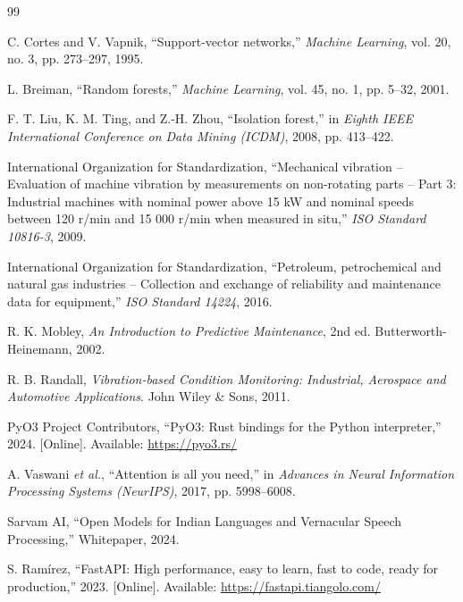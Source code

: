\documentclass[12pt,a4paper,oneside]{report}
\begin{document}
\newpage
\begin{thebibliography}{99}

C. Cortes and V. Vapnik, ``Support-vector networks,'' \textit{Machine Learning}, vol. 20, no. 3, pp. 273--297, 1995.

L. Breiman, ``Random forests,'' \textit{Machine Learning}, vol. 45, no. 1, pp. 5--32, 2001.

F. T. Liu, K. M. Ting, and Z.-H. Zhou, ``Isolation forest,'' in \textit{Eighth IEEE International Conference on Data Mining (ICDM)}, 2008, pp. 413--422.

International Organization for Standardization, ``Mechanical vibration -- Evaluation of machine vibration by measurements on non-rotating parts -- Part 3: Industrial machines with nominal power above 15 kW and nominal speeds between 120 r/min and 15 000 r/min when measured in situ,'' \textit{ISO Standard 10816-3}, 2009.

International Organization for Standardization, ``Petroleum, petrochemical and natural gas industries -- Collection and exchange of reliability and maintenance data for equipment,'' \textit{ISO Standard 14224}, 2016.

R. K. Mobley, \textit{An Introduction to Predictive Maintenance}, 2nd ed. Butterworth-Heinemann, 2002.

R. B. Randall, \textit{Vibration-based Condition Monitoring: Industrial, Aerospace and Automotive Applications}. John Wiley \& Sons, 2011.

PyO3 Project Contributors, ``PyO3: Rust bindings for the Python interpreter,'' 2024. [Online]. Available: \url{https://pyo3.rs/}

A. Vaswani \textit{et al.}, ``Attention is all you need,'' in \textit{Advances in Neural Information Processing Systems (NeurIPS)}, 2017, pp. 5998--6008.

Sarvam AI, ``Open Models for Indian Languages and Vernacular Speech Processing,'' Whitepaper, 2024.

S. Ramírez, ``FastAPI: High performance, easy to learn, fast to code, ready for production,'' 2023. [Online]. Available: \url{https://fastapi.tiangolo.com/}

\end{thebibliography}
\end{document}
